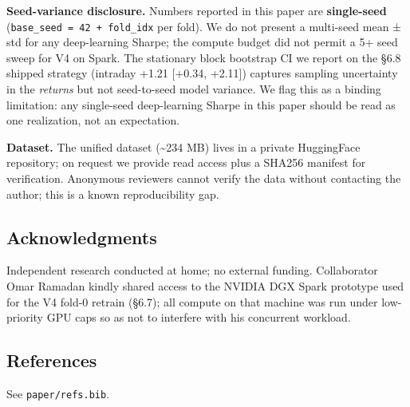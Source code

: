 \documentclass[
]{article}
\begin{document}
\textbf{Seed-variance disclosure.} Numbers reported in this paper are
\textbf{single-seed} (\texttt{base\_seed\ =\ 42\ +\ fold\_idx} per
fold). We do not present a multi-seed mean ± std for any deep-learning
Sharpe; the compute budget did not permit a 5+ seed sweep for V4 on
Spark. The stationary block bootstrap CI we report on the §6.8 shipped
strategy (intraday +1.21 {[}+0.34, +2.11{]}) captures sampling
uncertainty in the \emph{returns} but not seed-to-seed model variance.
We flag this as a binding limitation: any single-seed deep-learning
Sharpe in this paper should be read as one realization, not an
expectation.

\textbf{Dataset.} The unified dataset (\textasciitilde234 MB) lives in a
private HuggingFace repository; on request we provide read access plus a
SHA256 manifest for verification. Anonymous reviewers cannot verify the
data without contacting the author; this is a known reproducibility gap.

\subsection{Acknowledgments}\label{acknowledgments}

Independent research conducted at home; no external funding.
Collaborator Omar Ramadan kindly shared access to the NVIDIA DGX Spark
prototype used for the V4 fold-0 retrain (§6.7); all compute on that
machine was run under low-priority GPU caps so as not to interfere with
his concurrent workload.

\subsection{References}\label{references}

See \texttt{paper/refs.bib}.
\end{document}
